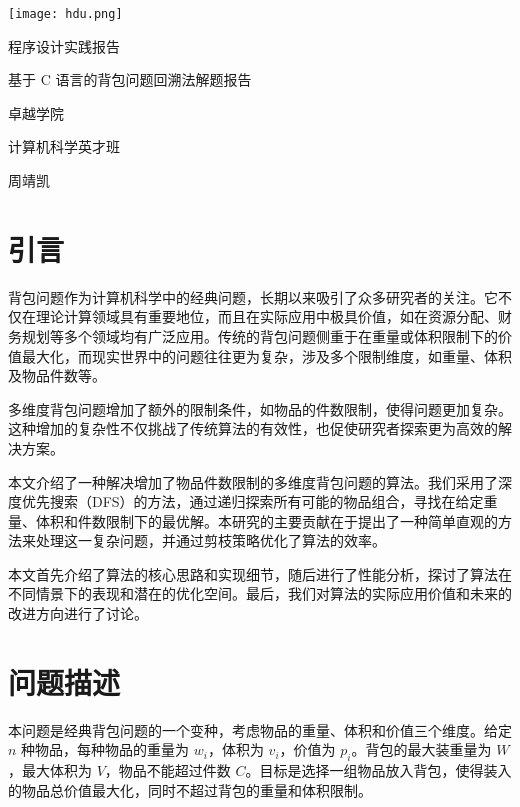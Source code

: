 \documentclass[12pt]{article}
\begin{document}
\begin{titlepage}


\parbox[c]{0pt}{
    \texttt{[image: hdu.png]}
}

\setlength{\parindent}{0pt}
\centering
\vfill
{ \heiti \textcolor{xblue}{程序设计实践报告}\par}
\vspace{10pt}
{ \heiti 基于 C 语言的背包问题回溯法解题报告\par}
\vfill
{\large \heiti 卓越学院\par
计算机科学英才班\par
周靖凯\par
}
\vfill
\restoregeometry

\end{titlepage}

\renewcommand\contentsname{\textcolor{xblue}{目录}}
\tableofcontents
\clearpage

\setcounter{page}{1}

\section{引言}

背包问题作为计算机科学中的经典问题，长期以来吸引了众多研究者的关注。它不仅在理论计算领域具有重要地位，而且在实际应用中极具价值，如在资源分配、财务规划等多个领域均有广泛应用。传统的背包问题侧重于在重量或体积限制下的价值最大化，而现实世界中的问题往往更为复杂，涉及多个限制维度，如重量、体积及物品件数等。

多维度背包问题增加了额外的限制条件，如物品的件数限制，使得问题更加复杂。这种增加的复杂性不仅挑战了传统算法的有效性，也促使研究者探索更为高效的解决方案。

本文介绍了一种解决增加了物品件数限制的多维度背包问题的算法。我们采用了深度优先搜索（DFS）的方法，通过递归探索所有可能的物品组合，寻找在给定重量、体积和件数限制下的最优解。本研究的主要贡献在于提出了一种简单直观的方法来处理这一复杂问题，并通过剪枝策略优化了算法的效率。

本文首先介绍了算法的核心思路和实现细节，随后进行了性能分析，探讨了算法在不同情景下的表现和潜在的优化空间。最后，我们对算法的实际应用价值和未来的改进方向进行了讨论。
\newpage

\section{问题描述}

本问题是经典背包问题的一个变种，考虑物品的重量、体积和价值三个维度。给定 $n$ 种物品，每种物品的重量为 $w_i$，体积为 $v_i$，价值为 $p_i$。背包的最大装重量为 $W$，最大体积为 $V$，物品不能超过件数 $C$。目标是选择一组物品放入背包，使得装入的物品总价值最大化，同时不超过背包的重量和体积限制。
\end{document}
